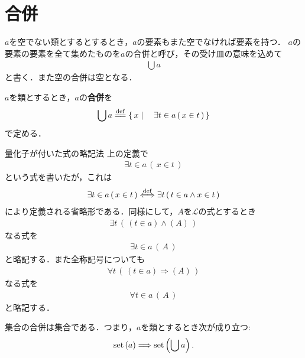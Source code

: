 \section{合併}
	$a$を空でない類とするとするとき，$a$の要素もまた空でなければ要素を持つ．
	$a$の要素の要素を全て集めたものを$a$の合併と呼び，その受け皿の意味を込めて
	\begin{align}
		\bigcup a
	\end{align}
	と書く．また空の合併は空となる．
	
	\begin{screen}
		\begin{dfn}[合併]
			$a$を類とするとき，$a$の{\bf 合併}を
			\begin{align}
				\bigcup a \defeq \Set{x}{\exists t \in a\, (\, x \in t\, )}
				\label{eq:definition_of_union_1}
			\end{align}
			で定める．
		\end{dfn}
	\end{screen}
	
	\begin{itembox}[l]{量化子が付いた式の略記法}
		上の定義で
		\begin{align}
			\exists t \in a\, (\, x \in t\, )
		\end{align}
		という式を書いたが，これは
		\begin{align}
			\exists t \in a\, (\, x \in t\, ) \overset{\mathrm{def}}{\Longleftrightarrow} \exists t\, (\, t \in a \wedge x \in t\, )
		\end{align}
		により定義される省略形である．同様にして，$A$を$\mathcal{L}$の式とするとき
		\begin{align}
			\exists t\, \left(\, (t \in a) \wedge (A)\, \right)
		\end{align}
		なる式を
		\begin{align}
			\exists t \in a\, (\, A\, )
		\end{align}
		と略記する．また全称記号についても
		\begin{align}
			\forall t\, \left(\, (t \in a) \Longrightarrow (A)\, \right)
		\end{align}
		なる式を
		\begin{align}
			\forall t \in a\, (\, A\, )
		\end{align}
		と略記する．
	\end{itembox}
	
	\begin{screen}
		\begin{axm}[合併の公理]
			集合の合併は集合である．つまり，$a$を類とするとき次が成り立つ:
			\begin{align}
				\operatorname*{set} \left(a\right) \Longrightarrow \operatorname*{set} \left(\bigcup a\right).
			\end{align}
		\end{axm}
	\end{screen}
	
